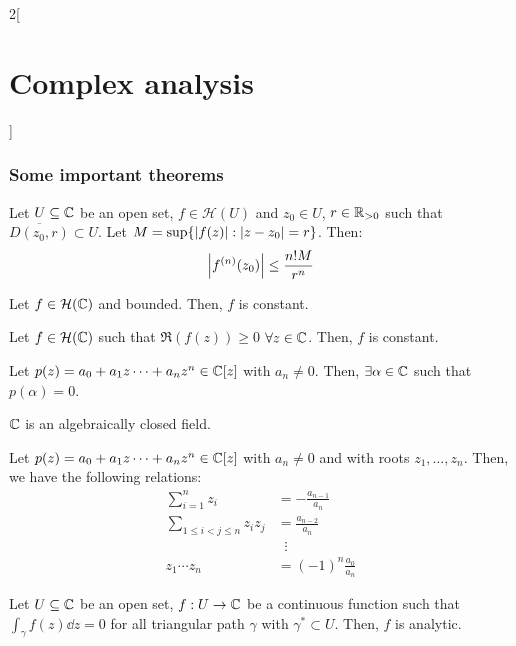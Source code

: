 \documentclass[../../../main.tex]{subfiles}
\begin{document}
\begin{multicols}{2}[\section{Complex analysis}]
  \subsubsection{Some important theorems}
  \begin{proposition}
    Let $U\subseteq\mathbb{C}$ be an open set, $f\in\mathcal{H}(U)$ and $z_0\in U$, $r\in\mathbb{R}_{>0}$ such that $\overline{D(z_0,r)}\subset U$. Let $M=\sup\{\abs{f(z)}:\abs{z-z_0}=r\}$. Then:
    $$\abs{f^{(n)}(z_0)}\leq\frac{n!M}{r^n}$$
  \end{proposition}
  \begin{theorem}
    Let $f\in\mathcal{H}(\mathbb{C})$ and bounded. Then, $f$ is constant.
  \end{theorem}
  \begin{corollary}
    Let $f\in\mathcal{H}(\mathbb{C})$ such that $\Re(f(z))\geq 0$ $\forall z\in\mathbb{C}$. Then, $f$ is constant.
  \end{corollary}
  \begin{theorem}
    Let $p(z)=a_0+a_1z\cdots+a_nz^n\in\mathbb{C}[z]$ with $a_n\ne 0$. Then, $\exists \alpha\in \mathbb{C}$ such that $p(\alpha)=0$.
  \end{theorem}
  \begin{corollary}
    $\mathbb{C}$ is an algebraically closed field.
  \end{corollary}
  \begin{proposition}
    Let $p(z)=a_0+a_1z\cdots+a_nz^n\in\mathbb{C}[z]$ with $a_n\ne 0$ and with roots $z_1,\ldots,z_n$. Then, we have the following relations:
    \begin{align*}
      \sum_{i=1}^nz_i              & =                    -\frac{a_{n-1}}{a_n}  \\
      \sum_{1\leq i<j\leq n}z_iz_j & =  \frac{a_{n-2}}{a_n}                     \\
                                   & \;\;\vdots                                 \\
      z_1\cdots z_n                & =                  {(-1)}^n\frac{a_0}{a_n}
    \end{align*}
  \end{proposition}
  \begin{theorem}
    Let $U\subseteq\mathbb{C}$ be an open set, $f:U\rightarrow\mathbb{C}$ be a continuous function such that $\displaystyle \int_\gamma f(z)\dd{z}=0$ for all triangular path $\gamma$ with $\gamma^*\subset U$. Then, $f$ is analytic.
  \end{theorem}

\end{multicols}
\end{document}
